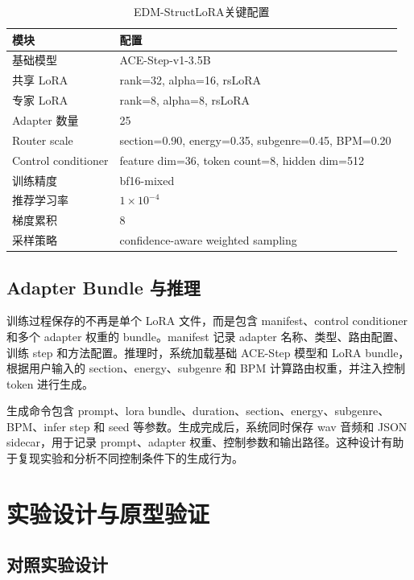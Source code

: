 \documentclass[UTF8,a4paper,zihao=-4,fontset=none]{ctexart}
\newcommand{\modelname}{EDM-StructLoRA}
\begin{document}
\begin{table}[H]
  \centering
  \caption{\modelname 关键配置}
  \label{tab:model_config}
  \begin{tabular}{ll}
    \toprule
    模块 & 配置 \\
    \midrule
    基础模型 & ACE-Step-v1-3.5B \\
    共享 LoRA & rank=32, alpha=16, rsLoRA \\
    专家 LoRA & rank=8, alpha=8, rsLoRA \\
    Adapter 数量 & 25 \\
    Router scale & section=0.90, energy=0.35, subgenre=0.45, BPM=0.20 \\
    Control conditioner & feature dim=36, token count=8, hidden dim=512 \\
    训练精度 & bf16-mixed \\
    推荐学习率 & $1\times10^{-4}$ \\
    梯度累积 & 8 \\
    采样策略 & confidence-aware weighted sampling \\
    \bottomrule
  \end{tabular}
\end{table}

\subsection{Adapter Bundle 与推理}

训练过程保存的不再是单个 LoRA 文件，而是包含 manifest、control conditioner 和多个 adapter 权重的 bundle。manifest 记录 adapter 名称、类型、路由配置、训练 step 和方法配置。推理时，系统加载基础 ACE-Step 模型和 LoRA bundle，根据用户输入的 section、energy、subgenre 和 BPM 计算路由权重，并注入控制 token 进行生成。

生成命令包含 prompt、lora bundle、duration、section、energy、subgenre、BPM、infer step 和 seed 等参数。生成完成后，系统同时保存 wav 音频和 JSON sidecar，用于记录 prompt、adapter 权重、控制参数和输出路径。这种设计有助于复现实验和分析不同控制条件下的生成行为。

\section{实验设计与原型验证}

\subsection{对照实验设计}
\end{document}

